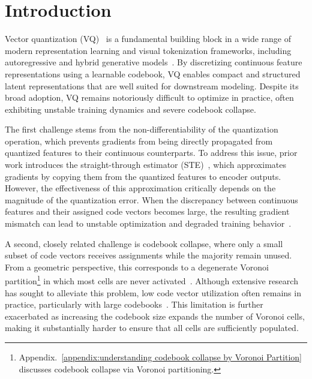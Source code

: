 \section{Introduction}\label{sec:introduction}

Vector quantization (VQ)~\cite{Oord2017NeuralDR} is a fundamental building block in a wide range of modern representation learning and visual tokenization frameworks, including autoregressive and hybrid generative models~\cite{Razavi2019GeneratingDH,Esser2020TamingTF,Chang2022MaskGITMG,Lee2022AutoregressiveIG,Gu2021VectorQD,Tian2024VisualAM,Li2024XQGANAO}. By discretizing continuous feature representations using a learnable codebook, VQ enables compact and structured latent representations that are well suited for downstream modeling. Despite its broad adoption, VQ remains notoriously difficult to optimize in practice, often exhibiting unstable training dynamics and severe codebook collapse.


The first challenge stems from the non-differentiability of the quantization operation, which prevents gradients from being directly propagated from quantized features to their continuous counterparts. To address this issue, prior work introduces the straight-through estimator (STE)~\cite{bengio2013estimating,Oord2017NeuralDR}, which approximates gradients by copying them from the quantized features to encoder outputs. However, the effectiveness of this approximation critically depends on the magnitude of the quantization error. When the discrepancy between continuous features and their assigned code vectors becomes large, the resulting gradient mismatch can lead to unstable optimization and degraded training behavior~\cite{Lee2022AutoregressiveIG}.



A second, closely related challenge is codebook collapse, where only a small subset of code vectors receives assignments while the majority remain unused. From a geometric perspective, this corresponds to a degenerate Voronoi partition\footnote{Appendix.~\ref{appendix:understanding codebook collapse by Voronoi Partition} discusses codebook collapse via Voronoi partitioning.} in which most cells are never activated~\cite{Zheng2023OnlineCC}. Although extensive research has sought to alleviate this problem, low code vector utilization often remains in practice, particularly with large codebooks~\cite{Dhariwal2020JukeboxAG,Takida2022SQVAEVB,Yu2021VectorquantizedIM,Lee2022AutoregressiveIG,Zheng2023OnlineCC}. This limitation is further exacerbated as increasing the codebook size expands the number of Voronoi cells, making it substantially harder to ensure that all cells are sufficiently populated.




